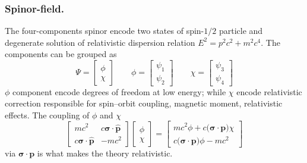 \documentclass[../../../main.tex]{subfiles}
\begin{document}
\subsubsection{Spinor-field.}
The four-components spinor encode two states of spin-$1/2$ particle and degenerate solution of relativistic dispersion relation $E^2 = p^2c^2+m^2c^4$.
The components can be grouped as
\begin{equation*}
    \Psi = \begin{bmatrix}\phi\\\chi\end{bmatrix} \qquad
    \phi = \begin{bmatrix}\psi_1\\\psi_2\end{bmatrix} \qquad
    \chi = \begin{bmatrix}\psi_3\\\psi_4\end{bmatrix}
\end{equation*}
$\phi$ component encode degrees of freedom at low energy; while $\chi$ encode relativistic correction responsible for spin–orbit coupling, magnetic moment, relativistic effects.
The coupling of $\phi$ and $\chi$
\begin{equation*}
    \begin{bmatrix}
        m c^{2}                                   & c \boldsymbol{\sigma}\cdot\hat{\mathbf{p}} \\
        c\boldsymbol{\sigma}\cdot\hat{\mathbf{p}} & -m c^{2}
    \end{bmatrix}
    \begin{bmatrix}\phi\\\chi\end{bmatrix}
    = \begin{bmatrix}
        mc^{2}\phi + c\bigl(\boldsymbol{\sigma}\cdot\mathbf{p}\bigr)\chi \\
        c\bigl(\boldsymbol{\sigma}\cdot\mathbf{p}\bigr)\phi - mc^{2}
    \end{bmatrix}
\end{equation*}
via $\boldsymbol{\sigma}\cdot \mathbf{p}$  is what makes the theory relativistic.
\end{document}
